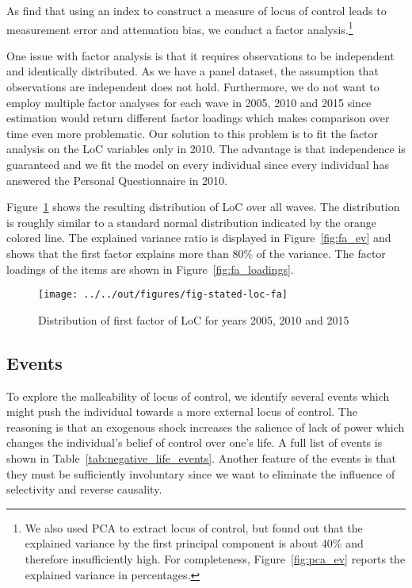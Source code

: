 \documentclass[12pt, a4paper, fleqn, parskip]{scrartcl}
\begin{document}
As \citet{piatek2016} find that using an index to construct a measure of locus of
control leads to measurement error and attenuation bias, we conduct a factor
analysis.\footnote{We also used PCA to extract locus of control, but found out that the
explained variance by the first principal component is about 40\% and therefore
insufficiently high. For completeness, Figure~\ref{fig:pca_ev} reports the explained
variance in percentages.}

One issue with factor analysis is that it requires observations to be independent and
identically distributed. As we have a panel dataset, the assumption that observations
are independent does not hold. Furthermore, we do not want to employ multiple factor
analyses for each wave in 2005, 2010 and 2015 since estimation would return different
factor loadings which makes comparison over time even more problematic. Our solution to
this problem is to fit the factor analysis on the LoC variables only in 2010. The
advantage is that independence is guaranteed and we fit the model on every individual
since every individual has answered the Personal Questionnaire in 2010.

Figure~\ref{fig:stated_loc} shows the resulting distribution of LoC over all waves. The
distribution is roughly similar to a standard normal distribution indicated by the
orange colored line. The explained variance ratio is displayed in Figure~\ref{fig:fa_ev}
and shows that the first factor explains more than 80\% of the variance. The factor
loadings of the items are shown in Figure~\ref{fig:fa_loadings}.

\begin{figure}[H]
    \centering
    \texttt{[image: ../../out/figures/fig-stated-loc-fa]}
    \caption{Distribution of first factor of LoC for years 2005, 2010 and 2015}
    \label{fig:stated_loc}
\end{figure}



\subsection{Events} %
\label{sub:events}

To explore the malleability of locus of control, we identify several events which might
push the individual towards a more external locus of control. The reasoning is that an
exogenous shock increases the salience of lack of power which changes the individual's
belief of control over one's life. A full list of events is shown in
Table~\ref{tab:negative_life_events}. Another feature of the events is that they must be
sufficiently involuntary since we want to eliminate the influence of selectivity and
reverse causality.
\end{document}
